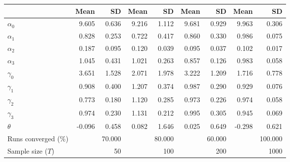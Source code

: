 
\begin{tabular}[t]{lrrrrrrrr}
\toprule
  & Mean & SD & Mean  & SD  & Mean   & SD   & Mean    & SD   \\
\midrule
$\alpha_{0}$ & 9.605 & 0.636 & 9.216 & 1.112 & 9.681 & 0.929 & 9.963 & 0.306\\
$\alpha_{1}$ & 0.828 & 0.253 & 0.722 & 0.417 & 0.860 & 0.330 & 0.986 & 0.075\\
$\alpha_{2}$ & 0.187 & 0.095 & 0.120 & 0.039 & 0.095 & 0.037 & 0.102 & 0.017\\
$\alpha_{3}$ & 1.045 & 0.431 & 1.021 & 0.263 & 0.857 & 0.126 & 0.983 & 0.058\\
$\gamma_{0}$ & 3.651 & 1.528 & 2.071 & 1.978 & 3.222 & 1.209 & 1.716 & 0.778\\
$\gamma_{1}$ & 0.908 & 0.400 & 1.207 & 0.374 & 0.987 & 0.290 & 0.929 & 0.076\\
$\gamma_{2}$ & 0.773 & 0.180 & 1.120 & 0.285 & 0.973 & 0.226 & 0.974 & 0.058\\
$\gamma_{3}$ & 0.974 & 0.230 & 1.131 & 0.212 & 0.995 & 0.305 & 0.945 & 0.069\\
$\theta$ & -0.096 & 0.458 & 0.082 & 1.646 & 0.025 & 0.649 & -0.298 & 0.621\\
Runs converged (\%) &  & 70.000 &  & 80.000 &  & 60.000 &  & 100.000\\
Sample size ($T$) &  & 50 &  & 100 &  & 200 &  & 1000\\
\bottomrule
\end{tabular}

